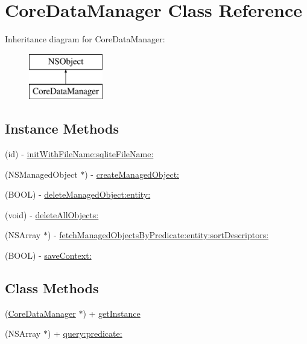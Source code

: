 \hypertarget{interface_core_data_manager}{\section{Core\+Data\+Manager Class Reference}
\label{interface_core_data_manager}
}
Inheritance diagram for Core\+Data\+Manager\+:\begin{figure}[H]
\begin{center}
\leavevmode
\includegraphics[height=2.000000cm]{interface_core_data_manager}
\end{center}
\end{figure}
\subsection*{Instance Methods}
\begin{DoxyCompactItemize}
\item 
(id) -\/ \hyperlink{interface_core_data_manager_ac99be2a18e096a2612cc9eafa5f88b36}{init\+With\+File\+Name\+:sqlite\+File\+Name\+:}
\item 
(N\+S\+Managed\+Object $\ast$) -\/ \hyperlink{interface_core_data_manager_a411a27a6c1fcaea2e894ffc9713fcb14}{create\+Managed\+Object\+:}
\item 
(B\+O\+O\+L) -\/ \hyperlink{interface_core_data_manager_adee944022fd4c8d45c33fe6b04b4c82f}{delete\+Managed\+Object\+:entity\+:}
\item 
(void) -\/ \hyperlink{interface_core_data_manager_a16e04f79be0510697bf6e9e0575dc33e}{delete\+All\+Objects\+:}
\item 
(N\+S\+Array $\ast$) -\/ \hyperlink{interface_core_data_manager_ac3769e057a5db88cdfdc71abc5f1f9ca}{fetch\+Managed\+Objects\+By\+Predicate\+:entity\+:sort\+Descriptors\+:}
\item 
(B\+O\+O\+L) -\/ \hyperlink{interface_core_data_manager_a0d4599a7671866520395ee195e2268c8}{save\+Context\+:}
\end{DoxyCompactItemize}
\subsection*{Class Methods}
\begin{DoxyCompactItemize}
\item 
(\hyperlink{interface_core_data_manager}{Core\+Data\+Manager} $\ast$) + \hyperlink{interface_core_data_manager_a72a3b0a316fe7508d02b8f640dc7884b}{get\+Instance}
\item 
(N\+S\+Array $\ast$) + \hyperlink{interface_core_data_manager_a4f6f5e1997e472b1a9a5b50e9410713a}{query\+:predicate\+:}
\end{DoxyCompactItemize}
